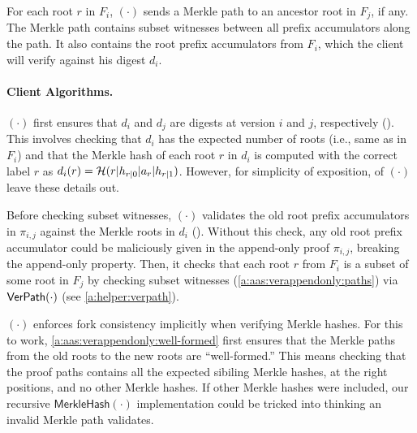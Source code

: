 For each root $r$ in $F_i$, {\proveappendonly}$(\cdot)$ sends a Merkle path to an ancestor root in $F_j$, if any.
The Merkle path contains subset witnesses between all prefix accumulators along the path.
It also contains the root prefix accumulators from $F_i$, which the client will verify against his digest $d_i$.

\paragraph{Client Algorithms.}
{\verappendonly}$(\cdot)$ first ensures that $d_i$ and $d_j$ are digests at version $i$ and $j$, respectively ().
This involves checking that $d_i$ has the expected number of roots (i.e., same as in $F_i$) and that the Merkle hash of each root $r$ in $d_i$ is computed with the correct label $r$ as $d_i(r)=\mathcal{H}(r|h_{r|0}|a_r|h_{r|1})$.
However, for simplicity of exposition,  of {\verappendonly}$(\cdot)$ leave these details out.

Before checking subset witnesses, {\verappendonly}$(\cdot)$ validates the old root prefix accumulators in $\pi_{i,j}$ against the Merkle roots in $d_i$ ().
Without this check, any old root prefix accumulator could be maliciously given in the append-only proof $\pi_{i,j}$, breaking the append-only property.
Then, it checks that each root $r$ from $F_i$ is a subset of some root in $F_j$ by checking subset witnesses (\cref{a:aas:verappendonly:paths}) via $\mathsf{VerPath}(\cdot)$ (see \cref{a:helper:verpath}).

{\verappendonly}$(\cdot)$ enforces fork consistency implicitly when verifying Merkle hashes.
For this to work, \cref{a:aas:verappendonly:well-formed} first ensures that the Merkle paths from the old roots to the new roots are ``well-formed.''
This means checking that the proof paths contains all the expected sibiling Merkle hashes, at the right positions, and no other Merkle hashes.
If other Merkle hashes were included, our recursive $\mathsf{MerkleHash}(\cdot)$ implementation could be tricked into thinking an invalid Merkle path validates.

